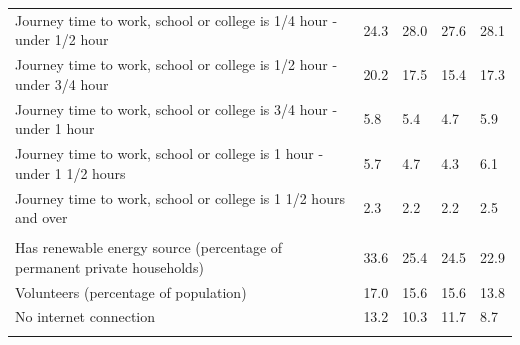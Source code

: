 \documentclass{article}
\begin{document}
\begin{table}[h]
\begin{tabular}{KTTTT}
Journey time to work, school or college is 1/4 hour - under 1/2 hour & 24.3& 28.0& 27.6& 28.1\\
Journey time to work, school or college is 1/2 hour - under 3/4 hour & 20.2& 17.5& 15.4& 17.3\\
Journey time to work, school or college is 3/4 hour - under 1 hour & 5.8& 5.4& 4.7& 5.9\\
Journey time to work, school or college is 1 hour - under 1 1/2 hours & 5.7& 4.7& 4.3& 6.1\\
Journey time to work, school or college is 1 1/2 hours and over & 2.3& 2.2& 2.2& 2.5\\
\hline
    \\ 
    \hline
Has renewable energy source (percentage of permanent private households) & 33.6& 25.4& 24.5& 22.9\\
    \hline
Volunteers (percentage of population) & 17.0& 15.6& 15.6& 13.8\\
    \hline
No internet connection& 13.2& 10.3& 11.7&  8.7\\
\hline
\end{tabular}
\end{table}
\end{document}
